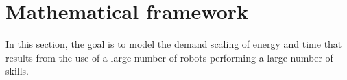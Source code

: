 \section{Mathematical framework}\label{sec:transfer_learning}
In this section, the goal is to model the demand scaling of energy and time that results from the use of a large number of robots performing a large number of skills.

